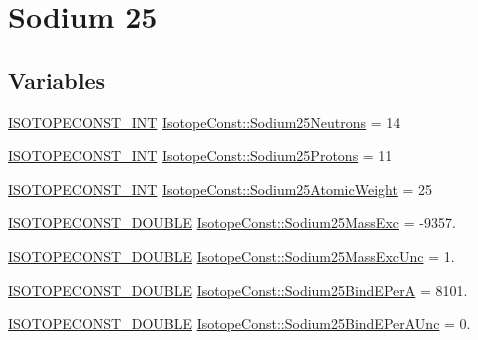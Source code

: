 \hypertarget{group___isotope_const-_sodium-_na25}{}\section{Sodium 25}
\label{group___isotope_const-_sodium-_na25}
\subsection*{Variables}
\begin{DoxyCompactItemize}
\item 
\mbox{\hyperlink{group___isotope_const-_macros_ga5f18360b3e99483a35c32d789e62621c}{I\+S\+O\+T\+O\+P\+E\+C\+O\+N\+S\+T\+\_\+\+I\+NT}} \mbox{\hyperlink{group___isotope_const-_sodium-_na25_ga27de94030007ce4dc3afc575d3c74985}{Isotope\+Const\+::\+Sodium25\+Neutrons}} = 14
\item 
\mbox{\hyperlink{group___isotope_const-_macros_ga5f18360b3e99483a35c32d789e62621c}{I\+S\+O\+T\+O\+P\+E\+C\+O\+N\+S\+T\+\_\+\+I\+NT}} \mbox{\hyperlink{group___isotope_const-_sodium-_na25_ga28004704fb688e5b7dcb42d4f1caa895}{Isotope\+Const\+::\+Sodium25\+Protons}} = 11
\item 
\mbox{\hyperlink{group___isotope_const-_macros_ga5f18360b3e99483a35c32d789e62621c}{I\+S\+O\+T\+O\+P\+E\+C\+O\+N\+S\+T\+\_\+\+I\+NT}} \mbox{\hyperlink{group___isotope_const-_sodium-_na25_ga8767d5ff0e5f0c6ad0cf5ce614b65c72}{Isotope\+Const\+::\+Sodium25\+Atomic\+Weight}} = 25
\item 
\mbox{\hyperlink{group___isotope_const-_macros_ga8f45a7272ce02c0b4c65c44636ed719a}{I\+S\+O\+T\+O\+P\+E\+C\+O\+N\+S\+T\+\_\+\+D\+O\+U\+B\+LE}} \mbox{\hyperlink{group___isotope_const-_sodium-_na25_gae336923a7cc0055e0e61653491698db6}{Isotope\+Const\+::\+Sodium25\+Mass\+Exc}} = -\/9357.
\item 
\mbox{\hyperlink{group___isotope_const-_macros_ga8f45a7272ce02c0b4c65c44636ed719a}{I\+S\+O\+T\+O\+P\+E\+C\+O\+N\+S\+T\+\_\+\+D\+O\+U\+B\+LE}} \mbox{\hyperlink{group___isotope_const-_sodium-_na25_gaf6b70f0e93254a038c5cce72c4a6b95a}{Isotope\+Const\+::\+Sodium25\+Mass\+Exc\+Unc}} = 1.
\item 
\mbox{\hyperlink{group___isotope_const-_macros_ga8f45a7272ce02c0b4c65c44636ed719a}{I\+S\+O\+T\+O\+P\+E\+C\+O\+N\+S\+T\+\_\+\+D\+O\+U\+B\+LE}} \mbox{\hyperlink{group___isotope_const-_sodium-_na25_ga4b747d8c9862a6e46bc1d4939eaba9bb}{Isotope\+Const\+::\+Sodium25\+Bind\+E\+PerA}} = 8101.
\item 
\mbox{\hyperlink{group___isotope_const-_macros_ga8f45a7272ce02c0b4c65c44636ed719a}{I\+S\+O\+T\+O\+P\+E\+C\+O\+N\+S\+T\+\_\+\+D\+O\+U\+B\+LE}} \mbox{\hyperlink{group___isotope_const-_sodium-_na25_gaeed1a75045992f0a7dabf8bfb02ec87f}{Isotope\+Const\+::\+Sodium25\+Bind\+E\+Per\+A\+Unc}} = 0.

\end{DoxyCompactItemize}
